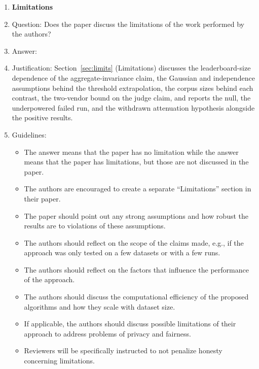 \documentclass{article}
\begin{document}
\begin{enumerate}
\item {\bf Limitations}
    \item[] Question: Does the paper discuss the limitations of the work performed by the authors?
    \item[] Answer: \answerYes{}
    \item[] Justification: Section~\ref{sec:limits} (Limitations) discusses the leaderboard-size dependence of the aggregate-invariance claim, the Gaussian and independence assumptions behind the threshold extrapolation, the corpus sizes behind each contrast, the two-vendor bound on the judge claim, and reports the null, the underpowered failed run, and the withdrawn attenuation hypothesis alongside the positive results.
    \item[] Guidelines:
    \begin{itemize}
        \item The answer \answerNA{} means that the paper has no limitation while the answer \answerNo{} means that the paper has limitations, but those are not discussed in the paper.
        \item The authors are encouraged to create a separate ``Limitations'' section in their paper.
        \item The paper should point out any strong assumptions and how robust the results are to violations of these assumptions.
        \item The authors should reflect on the scope of the claims made, e.g., if the approach was only tested on a few datasets or with a few runs.
        \item The authors should reflect on the factors that influence the performance of the approach.
        \item The authors should discuss the computational efficiency of the proposed algorithms and how they scale with dataset size.
        \item If applicable, the authors should discuss possible limitations of their approach to address problems of privacy and fairness.
        \item Reviewers will be specifically instructed to not penalize honesty concerning limitations.
    \end{itemize}


\end{enumerate}
\end{document}
